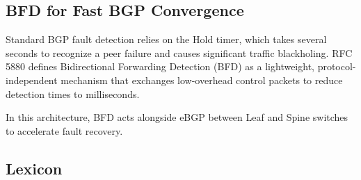 \subsection*{BFD for Fast BGP Convergence}
Standard BGP fault detection relies on the Hold timer, which takes several seconds to recognize a peer failure and causes significant traffic blackholing\cite{IETFRF5880}. RFC 5880 defines Bidirectional Forwarding Detection (BFD) as a lightweight, protocol-independent mechanism that exchanges low-overhead control packets to reduce detection times to milliseconds\cite{BFDConfiguration}.

In this architecture, BFD acts alongside eBGP between Leaf and Spine switches to accelerate fault recovery.

\subsection{Lexicon}
